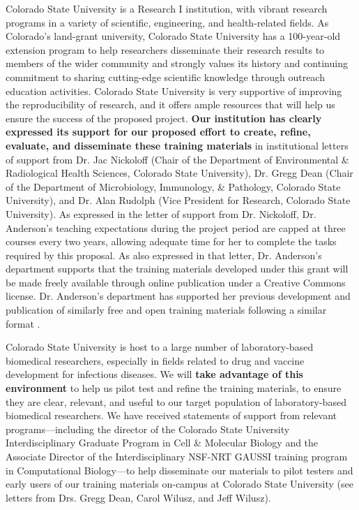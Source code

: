 \documentclass[pdftex,english,11.5pt,parskip=half]{scrartcl}
\begin{document}
Colorado State University is a Research I institution, with vibrant research programs in a variety of scientific, engineering, and health-related fields. As Colorado's land-grant university, Colorado State University has a 100-year-old extension program to help researchers disseminate their research results to members of the wider community and strongly values its history and continuing commitment to sharing cutting-edge scientific knowledge through outreach education activities. Colorado State University is very supportive of improving the reproducibility of
research, and it offers ample resources that will help us ensure the success of
the proposed project. \textbf{Our institution has clearly expressed its support
for our proposed effort to create, refine, evaluate, and disseminate these
training materials} in institutional letters of support from Dr. Jac Nickoloff
(Chair of the Department of Environmental \& Radiological Health Sciences, Colorado State University),
Dr. Gregg Dean (Chair of the Department of Microbiology, Immunology, \&
Pathology, Colorado State University), and Dr. Alan Rudolph (Vice President for Research, Colorado State University). As
expressed in the letter of support from Dr. Nickoloff, Dr. Anderson's teaching
expectations during the project period are capped at three courses every two
years, allowing adequate time for her to complete the tasks required by this
proposal. As also expressed in that letter, Dr. Anderson's department supports
that the training materials developed under this grant will be made freely
available through online publication under a Creative Commons license. Dr.
Anderson's department has supported her previous development and publication of
similarly free and open training materials following a similar format \cite{andersoncoursebook, andersonmastering}.

Colorado State University is host to a large number of laboratory-based
biomedical researchers, especially in fields related to drug and vaccine
development for infectious diseases. We will \textbf{take advantage of this
environment} to help us pilot test and refine the training materials, to ensure
they are clear, relevant, and useful to our target population of
laboratory-based biomedical researchers. We have received statements of support
from relevant programs---including the director of the Colorado State University Interdisciplinary
Graduate Program in Cell \& Molecular Biology and the Associate Director of the
Interdisciplinary NSF-NRT GAUSSI training program in Computational Biology---to
help disseminate our materials to pilot testers and early users of our training
materials on-campus at Colorado State University (see letters from Drs. Gregg Dean, Carol Wilusz, and Jeff
Wilusz). 
\end{document}
